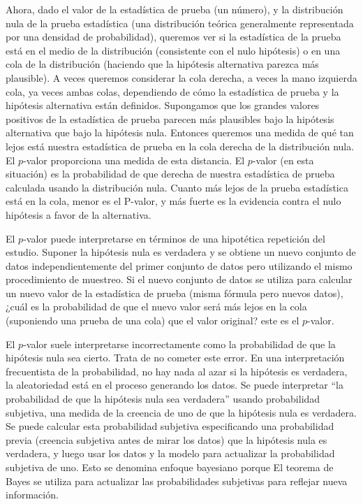 \documentclass[]{article}
\numberwithin{equation}{section}
\begin{document}
Ahora, dado el valor de la estadística de prueba (un número), y la
distribución nula de la prueba estadística (una distribución teórica
generalmente representada por una densidad de probabilidad), queremos
ver si la estadística de la prueba está en el medio de la distribución
(consistente con el nulo hipótesis) o en una cola de la distribución
(haciendo que la hipótesis alternativa parezca más plausible). A veces
queremos considerar la cola derecha, a veces la mano izquierda cola, ya
veces ambas colas, dependiendo de cómo la estadística de prueba y la
hipótesis alternativa están definidos. Supongamos que los grandes
valores positivos de la estadística de prueba parecen más plausibles
bajo la hipótesis alternativa que bajo la hipótesis nula. Entonces
queremos una medida de qué tan lejos está nuestra estadística de prueba
en la cola derecha de la distribución nula. El \(p\)-valor proporciona
una medida de esta distancia. El \(p\)-valor (en esta situación) es la
probabilidad de que derecha de nuestra estadística de prueba calculada
usando la distribución nula. Cuanto más lejos de la prueba estadística
está en la cola, menor es el P-valor, y más fuerte es la evidencia
contra el nulo hipótesis a favor de la alternativa.

El \(p\)-valor puede interpretarse en términos de una hipotética
repetición del estudio. Suponer la hipótesis nula es verdadera y se
obtiene un nuevo conjunto de datos independientemente del primer
conjunto de datos pero utilizando el mismo procedimiento de muestreo. Si
el nuevo conjunto de datos se utiliza para calcular un nuevo valor de la
estadística de prueba (misma fórmula pero nuevos datos), ¿cuál es la
probabilidad de que el nuevo valor será más lejos en la cola (suponiendo
una prueba de una cola) que el valor original? este es el \(p\)-valor.

El \(p\)-valor suele interpretarse incorrectamente como la probabilidad
de que la hipótesis nula sea cierto. Trata de no cometer este error. En
una interpretación frecuentista de la probabilidad, no hay nada al azar
si la hipótesis es verdadera, la aleatoriedad está en el proceso
generando los datos. Se puede interpretar ``la probabilidad de que la
hipótesis nula sea verdadera'' usando probabilidad subjetiva, una medida
de la creencia de uno de que la hipótesis nula es verdadera. Se puede
calcular esta probabilidad subjetiva especificando una probabilidad
previa (creencia subjetiva antes de mirar los datos) que la hipótesis
nula es verdadera, y luego usar los datos y la modelo para actualizar la
probabilidad subjetiva de uno. Esto se denomina enfoque bayesiano porque
El teorema de Bayes se utiliza para actualizar las probabilidades
subjetivas para reflejar nueva información.
\end{document}

